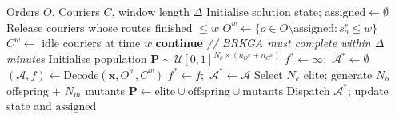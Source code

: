 \documentclass[runningheads]{llncs}
\begin{document}
\begin{algorithm}[ht]
\caption{BRKGA Rolling-Horizon main loop}
\label{alg:brkga_window}
\begin{algorithmic}[1]
\Require Orders $O$, Couriers $C$, window length $\Delta$
\State Initialise solution state; $\text{assigned} \leftarrow \emptyset$
    \State Release couriers whose routes finished $\leq w$
    \State $O^w \leftarrow \{o \in O \setminus \text{assigned} : s^r_o \leq w\}$
    \State $C^w \leftarrow$ idle couriers at time $w$
        \State \textbf{continue}
    \EndIf
    \State \textit{// BRKGA must complete within $\Delta$ minutes}
    \State Initialise population $\mathbf{P} \sim \mathcal{U}[0,1]^{N_p \times (n_{O^w}+n_{C^w})}$
    \State $f^* \leftarrow \infty$;\ $\mathcal{A}^* \leftarrow \emptyset$
     
            \State $(\mathcal{A}, f) \leftarrow \text{Decode}(\mathbf{x}, O^w, C^w)$
             $f^* \leftarrow f$;\ $\mathcal{A}^* \leftarrow \mathcal{A}$ \EndIf
        \EndFor
        \State Select $N_e$ elite; generate $N_o$ offspring + $N_m$ mutants
        \State $\mathbf{P} \leftarrow \text{elite} \cup \text{offspring} \cup \text{mutants}$
    \EndFor
    \State Dispatch $\mathcal{A}^*$; update state and $\text{assigned}$
\EndFor
\end{algorithmic}
\end{algorithm}

\end{document}
